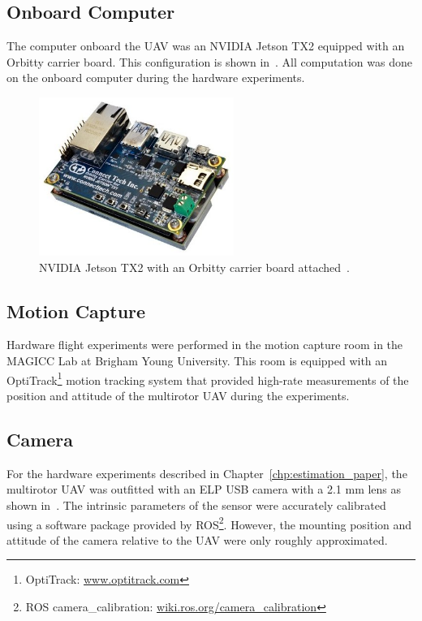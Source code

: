 \subsection{Onboard Computer}
The computer onboard the UAV was an NVIDIA Jetson TX2 equipped with an Orbitty
carrier board. This configuration is shown in~. All
computation was done on the onboard computer during the hardware experiments.

\begin{figure}[h]
  \centering
  \includegraphics[width=2.5in]{figures/tx2_orbitty.jpg}
  \caption[NVIDIA Jetson TX2 with Orbitty Carrier Board]{NVIDIA Jetson TX2
  with an Orbitty carrier board attached~\cite{orbitty}.
  }
  \label{fig:tx2_orbitty}
\end{figure}

\subsection{Motion Capture}
Hardware flight experiments were performed in the motion capture room in the
MAGICC Lab at Brigham Young University. This room is equipped with an OptiTrack\footnote{OptiTrack:
\url{www.optitrack.com}}
motion tracking system that
provided high-rate measurements of the position and attitude of the multirotor
UAV during the experiments.

\subsection{Camera}
For the hardware experiments described in Chapter~\ref{chp:estimation_paper},
the multirotor UAV was outfitted with an ELP USB camera with a 2.1 mm lens as
shown in~. The intrinsic parameters of the sensor were
accurately calibrated using a software package provided by ROS\footnote{ROS
camera\_calibration:
\url{wiki.ros.org/camera_calibration}}.
However, the mounting position and attitude of the camera relative to the UAV were only roughly
approximated.

